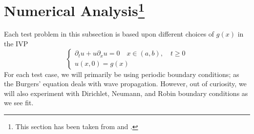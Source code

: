 \documentclass{myproject}
\begin{document}
\section{Numerical Analysis\protect\footnote{This section has been taken from \cite{learncfd} and \cite{trefethen2001}.}}
Each test problem in this subsection is based upon different choices of $g(x)$ in the IVP
\begin{equation}
    \begin{cases}
        \partial_t{u} + u\partial_x{u} = 0 \quad x \in (a,b), \quad t \geq 0 \\
        u(x, 0) = g(x)
    \end{cases}
\end{equation}
For each test case, we will primarily be using periodic boundary conditions; as the Burgers' equation deals with wave propagation. However, out of curiosity, we will also experiment with Dirichlet, Neumann, and Robin boundary conditions as we see fit.
\end{document}
